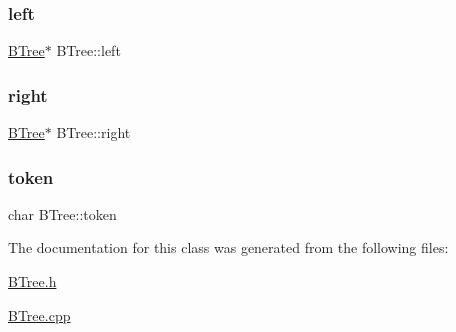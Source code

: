 \subsubsection{\texorpdfstring{left}{left}}
{\footnotesize\ttfamily \hyperlink{classBTree}{B\+Tree}$\ast$ B\+Tree\+::left}

\mbox{\label{classBTree_af95770a535a9278b37fd73d7b6ae7f5e}} 
\subsubsection{\texorpdfstring{right}{right}}
{\footnotesize\ttfamily \hyperlink{classBTree}{B\+Tree}$\ast$ B\+Tree\+::right}

\mbox{\label{classBTree_a3d5016b19ab621d5c61cf633ec012a72}} 
\subsubsection{\texorpdfstring{token}{token}}
{\footnotesize\ttfamily char B\+Tree\+::token}



The documentation for this class was generated from the following files\+:\begin{DoxyCompactItemize}
\item 
\hyperlink{BTree_8h}{B\+Tree.\+h}\item 
\hyperlink{BTree_8cpp}{B\+Tree.\+cpp}\end{DoxyCompactItemize}
